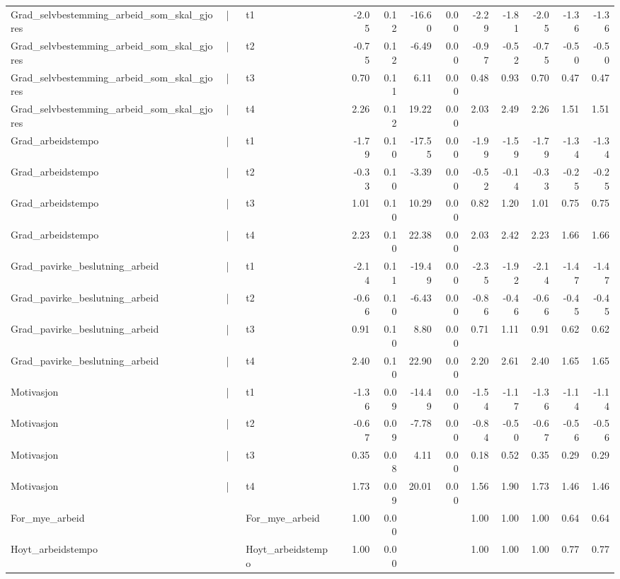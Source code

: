 \documentclass[
  12pt,
  a4paper,
  DIV=11,
  numbers=noendperiod]{scrartcl}
\begin{document}
\begin{table}[ht]
\begin{tabular}{llllrrrrrrrrr}
  Grad\_selvbestemming\_arbeid\_som\_skal\_gjores & | & t1 &  & -2.05 & 0.12 & -16.60 & 0.00 & -2.29 & -1.81 & -2.05 & -1.36 & -1.36 \\ 
  Grad\_selvbestemming\_arbeid\_som\_skal\_gjores & | & t2 &  & -0.75 & 0.12 & -6.49 & 0.00 & -0.97 & -0.52 & -0.75 & -0.50 & -0.50 \\ 
  Grad\_selvbestemming\_arbeid\_som\_skal\_gjores & | & t3 &  & 0.70 & 0.11 & 6.11 & 0.00 & 0.48 & 0.93 & 0.70 & 0.47 & 0.47 \\ 
  Grad\_selvbestemming\_arbeid\_som\_skal\_gjores & | & t4 &  & 2.26 & 0.12 & 19.22 & 0.00 & 2.03 & 2.49 & 2.26 & 1.51 & 1.51 \\ 
  Grad\_arbeidstempo & | & t1 &  & -1.79 & 0.10 & -17.55 & 0.00 & -1.99 & -1.59 & -1.79 & -1.34 & -1.34 \\ 
  Grad\_arbeidstempo & | & t2 &  & -0.33 & 0.10 & -3.39 & 0.00 & -0.52 & -0.14 & -0.33 & -0.25 & -0.25 \\ 
  Grad\_arbeidstempo & | & t3 &  & 1.01 & 0.10 & 10.29 & 0.00 & 0.82 & 1.20 & 1.01 & 0.75 & 0.75 \\ 
  Grad\_arbeidstempo & | & t4 &  & 2.23 & 0.10 & 22.38 & 0.00 & 2.03 & 2.42 & 2.23 & 1.66 & 1.66 \\ 
  Grad\_pavirke\_beslutning\_arbeid & | & t1 &  & -2.14 & 0.11 & -19.49 & 0.00 & -2.35 & -1.92 & -2.14 & -1.47 & -1.47 \\ 
  Grad\_pavirke\_beslutning\_arbeid & | & t2 &  & -0.66 & 0.10 & -6.43 & 0.00 & -0.86 & -0.46 & -0.66 & -0.45 & -0.45 \\ 
  Grad\_pavirke\_beslutning\_arbeid & | & t3 &  & 0.91 & 0.10 & 8.80 & 0.00 & 0.71 & 1.11 & 0.91 & 0.62 & 0.62 \\ 
  Grad\_pavirke\_beslutning\_arbeid & | & t4 &  & 2.40 & 0.10 & 22.90 & 0.00 & 2.20 & 2.61 & 2.40 & 1.65 & 1.65 \\ 
  Motivasjon & | & t1 &  & -1.36 & 0.09 & -14.49 & 0.00 & -1.54 & -1.17 & -1.36 & -1.14 & -1.14 \\ 
  Motivasjon & | & t2 &  & -0.67 & 0.09 & -7.78 & 0.00 & -0.84 & -0.50 & -0.67 & -0.56 & -0.56 \\ 
  Motivasjon & | & t3 &  & 0.35 & 0.08 & 4.11 & 0.00 & 0.18 & 0.52 & 0.35 & 0.29 & 0.29 \\ 
  Motivasjon & | & t4 &  & 1.73 & 0.09 & 20.01 & 0.00 & 1.56 & 1.90 & 1.73 & 1.46 & 1.46 \\ 
  For\_mye\_arbeid & ~~ & For\_mye\_arbeid &  & 1.00 & 0.00 &  &  & 1.00 & 1.00 & 1.00 & 0.64 & 0.64 \\ 
  Hoyt\_arbeidstempo & ~~ & Hoyt\_arbeidstempo &  & 1.00 & 0.00 &  &  & 1.00 & 1.00 & 1.00 & 0.77 & 0.77 \\ 

\end{tabular}
\end{table}
\end{document}

